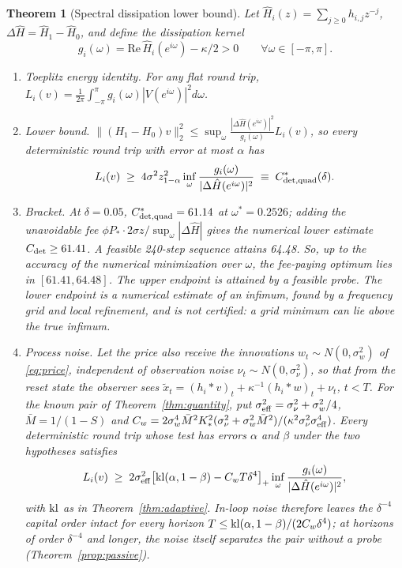 \documentclass[12pt]{article}
\newtheorem{theorem}{Theorem}[section]
\theoremstyle{definition}
\theoremstyle{remark}
\begin{document}
\begin{theorem}[Spectral dissipation lower bound]\label{thm:spectral}
Let $\hat H_i(z)=\sum_{j\ge0}h_{i,j}z^{-j}$, $\Delta\hat H=\hat H_1-\hat H_0$, and define the dissipation kernel
\begin{equation}\label{eq:gdiss}
g_i(\omega)=\mathrm{Re}\,\hat H_i(e^{i\omega})-\kappa/2>0\qquad\forall\omega\in[-\pi,\pi].
\end{equation}
\begin{enumerate}[label=(\roman*)]
\item \emph{Toeplitz energy identity.} For any flat round trip, $L_i(v)=\frac1{2\pi}\int_{-\pi}^{\pi}g_i(\omega)|V(e^{i\omega})|^2d\omega$.
\item \emph{Lower bound.} $\|(H_1-H_0)v\|_2^2\le\sup_\omega\frac{|\Delta\hat H(e^{i\omega})|^2}{g_i(\omega)}L_i(v)$, so every deterministic round trip with error at most $\alpha$ has
\begin{equation}\label{eq:Cdet}
L_i(v)\;\ge\;4\sigma^2z_{1-\alpha}^2\inf_\omega\frac{g_i(\omega)}{|\Delta\hat H(e^{i\omega})|^2}\;\equiv\;C^*_{\rm det,quad}(\delta).
\end{equation}
\item \emph{Bracket.} At $\delta=0.05$, $C^*_{\rm det,quad}=61.14$ at $\omega^*=0.2526$; adding the unavoidable fee $\phi P_*\cdot2\sigma z/\sup_\omega|\Delta\hat H|$ gives the numerical lower estimate $C_{\rm det}\ge61.41$. A feasible 240-step sequence attains 64.48. So, up to the accuracy of the numerical minimization over $\omega$, the fee-paying optimum lies in $[61.41,64.48]$. The upper endpoint is attained by a feasible probe. The lower endpoint is a numerical estimate of an infimum, found by a frequency grid and local refinement, and is not certified: a grid minimum can lie above the true infimum.
\item \emph{Process noise.} Let the price also receive the innovations $w_t\sim N(0,\sigma_w^2)$ of \eqref{eq:price}, independent of observation noise $\nu_t\sim N(0,\sigma_\nu^2)$, so that from the reset state the observer sees $\tilde x_t=(h_i*v)_t+\kappa^{-1}(h_i*w)_t+\nu_t$, $t<T$. For the known pair of Theorem~\ref{thm:quantity}, put $\sigma_{\rm eff}^2=\sigma_\nu^2+\sigma_w^2/4$, $\bar M=1/(1-S)$ and $C_w=2\sigma_w^4\bar M^2K_*^2(\sigma_\nu^2+\sigma_w^2\bar M^2)/(\kappa^2\sigma_\nu^2\sigma_{\rm eff}^4)$. Every deterministic round trip whose test has errors $\alpha$ and $\beta$ under the two hypotheses satisfies
\begin{equation}\label{eq:Cnoise}
L_i(v)\;\ge\;2\sigma_{\rm eff}^2\bigl[{\rm kl}(\alpha,1-\beta)-C_wT\delta^4\bigr]_+\inf_\omega\frac{g_i(\omega)}{|\Delta\hat H(e^{i\omega})|^2},
\end{equation}
with ${\rm kl}$ as in Theorem~\ref{thm:adaptive}. In-loop noise therefore leaves the $\delta^{-4}$ capital order intact for every horizon $T\le{\rm kl}(\alpha,1-\beta)/(2C_w\delta^4)$; at horizons of order $\delta^{-4}$ and longer, the noise itself separates the pair without a probe (Theorem~\ref{prop:passive}).
\end{enumerate}
\end{theorem}
\end{document}
